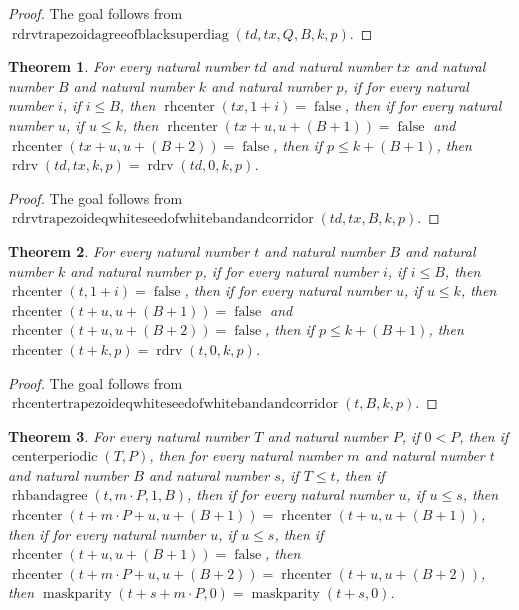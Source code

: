 \documentclass[11pt]{article}
\newtheorem{theorem}{Theorem}[section]
\theoremstyle{definition}
\begin{document}
\begin{proof}
The goal follows from \(\operatorname{rdrvtrapezoidagreeofblacksuperdiag}(td, tx, Q, B, k, p)\).
\end{proof}
\begin{theorem}
\label{ll:paper:rdrv-trapezoid-eq-white-seed-of-white-band-and-corridor}
For every natural number \(td\) and natural number \(tx\) and natural number \(B\) and natural number \(k\) and natural number \(p\), if for every natural number \(i\), if \(i \le B\), then \(\operatorname{rhcenter}(tx, 1 + i) = \operatorname{false}\), then if for every natural number \(u\), if \(u \le k\), then \(\operatorname{rhcenter}(tx + u, u + (B + 1)) = \operatorname{false}\) and \(\operatorname{rhcenter}(tx + u, u + (B + 2)) = \operatorname{false}\), then if \(p \le k + (B + 1)\), then \(\operatorname{rdrv}(td, tx, k, p) = \operatorname{rdrv}(td, 0, k, p)\).
\end{theorem}
\begin{proof}
The goal follows from \(\operatorname{rdrvtrapezoideqwhiteseedofwhitebandandcorridor}(td, tx, B, k, p)\).
\end{proof}
\begin{theorem}
\label{ll:paper:rhcenter-trapezoid-eq-white-seed-of-white-band-and-corridor}
For every natural number \(t\) and natural number \(B\) and natural number \(k\) and natural number \(p\), if for every natural number \(i\), if \(i \le B\), then \(\operatorname{rhcenter}(t, 1 + i) = \operatorname{false}\), then if for every natural number \(u\), if \(u \le k\), then \(\operatorname{rhcenter}(t + u, u + (B + 1)) = \operatorname{false}\) and \(\operatorname{rhcenter}(t + u, u + (B + 2)) = \operatorname{false}\), then if \(p \le k + (B + 1)\), then \(\operatorname{rhcenter}(t + k, p) = \operatorname{rdrv}(t, 0, k, p)\).
\end{theorem}
\begin{proof}
The goal follows from \(\operatorname{rhcentertrapezoideqwhiteseedofwhitebandandcorridor}(t, B, k, p)\).
\end{proof}
\begin{theorem}
\label{ll:paper:periodic-maskparity-zero-agree-of-superdiag-gate}
For every natural number \(T\) and natural number \(P\), if \(0 < P\), then if \(\operatorname{centerperiodic}(T, P)\), then for every natural number \(m\) and natural number \(t\) and natural number \(B\) and natural number \(s\), if \(T \le t\), then if \(\operatorname{rhbandagree}(t, m \cdot P, 1, B)\), then if for every natural number \(u\), if \(u \le s\), then \(\operatorname{rhcenter}(t + m \cdot P + u, u + (B + 1)) = \operatorname{rhcenter}(t + u, u + (B + 1))\), then if for every natural number \(u\), if \(u \le s\), then if \(\operatorname{rhcenter}(t + u, u + (B + 1)) = \operatorname{false}\), then \(\operatorname{rhcenter}(t + m \cdot P + u, u + (B + 2)) = \operatorname{rhcenter}(t + u, u + (B + 2))\), then \(\operatorname{maskparity}(t + s + m \cdot P, 0) = \operatorname{maskparity}(t + s, 0)\).
\end{theorem}
\end{document}
